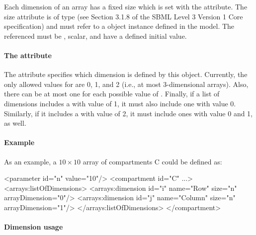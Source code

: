 Each dimension of an array has a fixed size which is set with the  attribute.  The size attribute is of type  (see Section 3.1.8 of the SBML Level 3 Version 1 Core specification) and must refer to a \Parameter object instance defined in the model.  The \Parameter referenced must be , scalar, and have a defined initial value.

\paragraph{The  attribute}

The  attribute specifies which dimension is defined by this \Dimension object.  
Currently, the only allowed values for  are 0, 1, and 2 (i.e., at most 3-dimensional arrays).  Also, there can be at most one \Dimension for each possible value of .  Finally, if a list of dimensions includes a \Dimension with  value of 1, it must also include one with value 0.  Similarly, if it includes a \Dimension with  value of 2, it must include ones with value 0 and 1, as well.  

\paragraph{Example}

As an example, a $10 \times 10$ array of compartments C could be defined as:

\begin{example}
<parameter id="n" value="10"/>
<compartment id="C" ...>
  <arrays:listOfDimensions>
    <arrays:dimension id="i" name="Row" size="n" arrayDimension="0"/>
    <arrays:dimension id="j" name="Column" size="n" arrayDimension="1"/>
  </arrays:listOfDimensions>
</compartment>
\end{example}

\paragraph{Dimension usage}
\label{sec:dimensionUsage}

